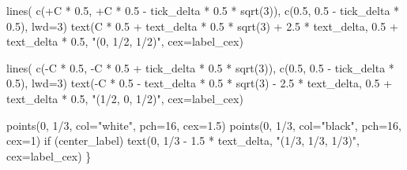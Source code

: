 \documentclass[
  letterpaper,
  DIV=11,
  numbers=noendperiod]{scrartcl}
\newenvironment{Shaded}{\begin{snugshade}}{\end{snugshade}}
\newcommand{\AttributeTok}[1]{\textcolor[rgb]{0.40,0.45,0.13}{#1}}
\newcommand{\ControlFlowTok}[1]{\textcolor[rgb]{0.00,0.23,0.31}{#1}}
\newcommand{\DecValTok}[1]{\textcolor[rgb]{0.68,0.00,0.00}{#1}}
\newcommand{\FloatTok}[1]{\textcolor[rgb]{0.68,0.00,0.00}{#1}}
\newcommand{\FunctionTok}[1]{\textcolor[rgb]{0.28,0.35,0.67}{#1}}
\newcommand{\NormalTok}[1]{\textcolor[rgb]{0.00,0.23,0.31}{#1}}
\newcommand{\SpecialCharTok}[1]{\textcolor[rgb]{0.37,0.37,0.37}{#1}}
\newcommand{\StringTok}[1]{\textcolor[rgb]{0.13,0.47,0.30}{#1}}
\begin{document}
\begin{Shaded}
\begin{Highlighting}[]
  \FunctionTok{lines}\NormalTok{( }\FunctionTok{c}\NormalTok{(}\SpecialCharTok{+}\NormalTok{C }\SpecialCharTok{*} \FloatTok{0.5}\NormalTok{, }\SpecialCharTok{+}\NormalTok{C }\SpecialCharTok{*} \FloatTok{0.5} \SpecialCharTok{{-}}\NormalTok{ tick\_delta }\SpecialCharTok{*} \FloatTok{0.5} \SpecialCharTok{*} \FunctionTok{sqrt}\NormalTok{(}\DecValTok{3}\NormalTok{)),}
         \FunctionTok{c}\NormalTok{(}\FloatTok{0.5}\NormalTok{, }\FloatTok{0.5} \SpecialCharTok{{-}}\NormalTok{ tick\_delta }\SpecialCharTok{*} \FloatTok{0.5}\NormalTok{), }\AttributeTok{lwd=}\DecValTok{3}\NormalTok{)}
  \FunctionTok{text}\NormalTok{(C }\SpecialCharTok{*} \FloatTok{0.5} \SpecialCharTok{+}\NormalTok{ text\_delta }\SpecialCharTok{*} \FloatTok{0.5} \SpecialCharTok{*} \FunctionTok{sqrt}\NormalTok{(}\DecValTok{3}\NormalTok{) }\SpecialCharTok{+} \FloatTok{2.5} \SpecialCharTok{*}\NormalTok{ text\_delta,}
       \FloatTok{0.5} \SpecialCharTok{+}\NormalTok{ text\_delta }\SpecialCharTok{*} \FloatTok{0.5}\NormalTok{, }\StringTok{"(0, 1/2, 1/2)"}\NormalTok{, }\AttributeTok{cex=}\NormalTok{label\_cex)}

  \FunctionTok{lines}\NormalTok{( }\FunctionTok{c}\NormalTok{(}\SpecialCharTok{{-}}\NormalTok{C }\SpecialCharTok{*} \FloatTok{0.5}\NormalTok{, }\SpecialCharTok{{-}}\NormalTok{C }\SpecialCharTok{*} \FloatTok{0.5} \SpecialCharTok{+}\NormalTok{ tick\_delta }\SpecialCharTok{*} \FloatTok{0.5} \SpecialCharTok{*} \FunctionTok{sqrt}\NormalTok{(}\DecValTok{3}\NormalTok{)),}
         \FunctionTok{c}\NormalTok{(}\FloatTok{0.5}\NormalTok{, }\FloatTok{0.5} \SpecialCharTok{{-}}\NormalTok{ tick\_delta }\SpecialCharTok{*} \FloatTok{0.5}\NormalTok{), }\AttributeTok{lwd=}\DecValTok{3}\NormalTok{)}
  \FunctionTok{text}\NormalTok{(}\SpecialCharTok{{-}}\NormalTok{C }\SpecialCharTok{*} \FloatTok{0.5} \SpecialCharTok{{-}}\NormalTok{ text\_delta }\SpecialCharTok{*} \FloatTok{0.5} \SpecialCharTok{*} \FunctionTok{sqrt}\NormalTok{(}\DecValTok{3}\NormalTok{) }\SpecialCharTok{{-}} \FloatTok{2.5} \SpecialCharTok{*}\NormalTok{ text\_delta,}
       \FloatTok{0.5} \SpecialCharTok{+}\NormalTok{ text\_delta }\SpecialCharTok{*} \FloatTok{0.5}\NormalTok{, }\StringTok{"(1/2, 0, 1/2)"}\NormalTok{, }\AttributeTok{cex=}\NormalTok{label\_cex)}

  \FunctionTok{points}\NormalTok{(}\DecValTok{0}\NormalTok{, }\DecValTok{1}\SpecialCharTok{/}\DecValTok{3}\NormalTok{, }\AttributeTok{col=}\StringTok{"white"}\NormalTok{, }\AttributeTok{pch=}\DecValTok{16}\NormalTok{, }\AttributeTok{cex=}\FloatTok{1.5}\NormalTok{)}
  \FunctionTok{points}\NormalTok{(}\DecValTok{0}\NormalTok{, }\DecValTok{1}\SpecialCharTok{/}\DecValTok{3}\NormalTok{, }\AttributeTok{col=}\StringTok{"black"}\NormalTok{, }\AttributeTok{pch=}\DecValTok{16}\NormalTok{, }\AttributeTok{cex=}\DecValTok{1}\NormalTok{)}
  \ControlFlowTok{if}\NormalTok{ (center\_label)}
    \FunctionTok{text}\NormalTok{(}\DecValTok{0}\NormalTok{, }\DecValTok{1}\SpecialCharTok{/}\DecValTok{3} \SpecialCharTok{{-}} \FloatTok{1.5} \SpecialCharTok{*}\NormalTok{ text\_delta, }\StringTok{"(1/3, 1/3, 1/3)"}\NormalTok{, }\AttributeTok{cex=}\NormalTok{label\_cex)}
\NormalTok{\}}


\end{Highlighting}
\end{Shaded}
\end{document}
